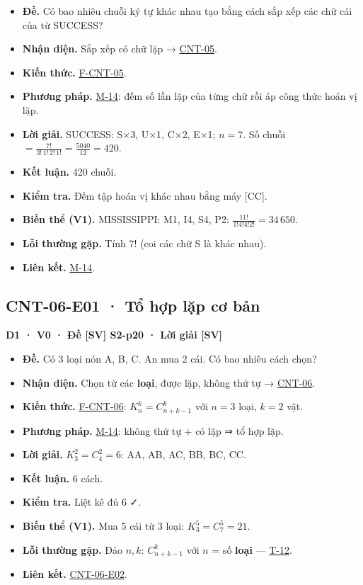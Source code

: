 \documentclass[
  10pt,
  twoside,openany]{book}
\providecommand{\tightlist}{%
  \setlength{\itemsep}{0pt}\setlength{\parskip}{0pt}}
\begin{document}
\begin{itemize}
\tightlist
\item
  \textbf{Đề.} Có bao nhiêu chuỗi ký tự khác nhau tạo bằng cách sắp xếp
  các chữ cái của từ SUCCESS?
\item
  \textbf{Nhận diện.} Sắp xếp có chữ lặp →
  \protect\hyperlink{CNT-05}{CNT-05}.
\item
  \textbf{Kiến thức.} \protect\hyperlink{F-CNT-05}{F-CNT-05}.
\item
  \textbf{Phương pháp.} \protect\hyperlink{M-14}{M-14}: đếm số lần lặp
  của từng chữ rồi áp công thức hoán vị lặp.
\item
  \textbf{Lời giải.} SUCCESS: S×3, U×1, C×2, E×1; \(n=7\). Số chuỗi
  \(=\frac{7!}{3!\,1!\,2!\,1!}=\frac{5040}{12}=420\).
\item
  \textbf{Kết luận.} 420 chuỗi.
\item
  \textbf{Kiểm tra.} Đếm tập hoán vị khác nhau bằng máy {[}CC{]}.
\item
  \textbf{Biến thể (V1).} MISSISSIPPI: M1, I4, S4, P2:
  \(\frac{11!}{1!4!4!2!}=34\,650\).
\item
  \textbf{Lỗi thường gặp.} Tính \(7!\) (coi các chữ S là khác nhau).
\item
  \textbf{Liên kết.} \protect\hyperlink{M-14}{M-14}.
\end{itemize}

\hypertarget{CNT-06-E01}{%
\subsection{CNT-06-E01 · Tổ hợp lặp cơ bản}\label{CNT-06-E01}}

\textbf{D1 · V0 · Đề {[}SV{]} S2-p20 · Lời giải {[}SV{]}}

\begin{itemize}
\tightlist
\item
  \textbf{Đề.} Có 3 loại nón A, B, C. An mua 2 cái. Có bao nhiêu cách
  chọn?
\item
  \textbf{Nhận diện.} Chọn từ các \textbf{loại}, được lặp, không thứ tự
  → \protect\hyperlink{CNT-06}{CNT-06}.
\item
  \textbf{Kiến thức.} \protect\hyperlink{F-CNT-06}{F-CNT-06}:
  \(K_n^k=C_{n+k-1}^k\) với \(n=3\) loại, \(k=2\) vật.
\item
  \textbf{Phương pháp.} \protect\hyperlink{M-14}{M-14}: không thứ tự +
  có lặp ⇒ tổ hợp lặp.
\item
  \textbf{Lời giải.} \(K_3^2=C_4^2=6\): AA, AB, AC, BB, BC, CC.
\item
  \textbf{Kết luận.} 6 cách.
\item
  \textbf{Kiểm tra.} Liệt kê đủ 6 ✓.
\item
  \textbf{Biến thể (V1).} Mua 5 cái từ 3 loại: \(K_3^5=C_7^5=21\).
\item
  \textbf{Lỗi thường gặp.} Đảo \(n,k\): \(C_{n+k-1}^{k}\) với \(n\) = số
  \textbf{loại} --- \protect\hyperlink{T-12}{T-12}.
\item
  \textbf{Liên kết.} \protect\hyperlink{CNT-06-E02}{CNT-06-E02}.
\end{itemize}
\end{document}
